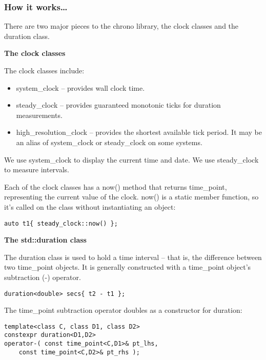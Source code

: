 \subsubsection{How it works…}

There are two major pieces to the chrono library, the clock classes and the duration class.

\noindent
\textbf{The clock classes}

The clock classes include:

\begin{itemize}
\item 
system\_clock – provides wall clock time.

\item 
steady\_clock – provides guaranteed monotonic ticks for duration measurements.

\item 
high\_resolution\_clock – provides the shortest available tick period. It may be an alias of system\_clock or steady\_clock on some systems.

\end{itemize}

We use system\_clock to display the current time and date. We use steady\_clock to measure intervals.

Each of the clock classes has a now() method that returns time\_point, representing the current value of the clock. now() is a static member function, so it's called on the class without instantiating an object:

\begin{lstlisting}[style=styleCXX]
auto t1{ steady_clock::now() };
\end{lstlisting}

\noindent
\textbf{The std::duration class}

The duration class is used to hold a time interval – that is, the difference between two time\_point objects. It is generally constructed with a time\_point object's subtraction (-) operator.

\begin{lstlisting}[style=styleCXX]
duration<double> secs{ t2 - t1 };
\end{lstlisting}

The time\_point subtraction operator doubles as a constructor for duration:

\begin{lstlisting}[style=styleCXX]
template<class C, class D1, class D2>
constexpr duration<D1,D2>
operator-( const time_point<C,D1>& pt_lhs,
	const time_point<C,D2>& pt_rhs );
\end{lstlisting}

